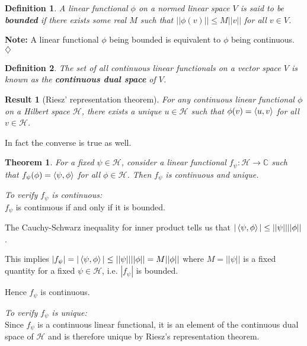 \documentclass[12pt,twoside,fleqn]{report}
\makeatletter
\theoremstyle{thmstyle}
\renewenvironment{proof}[1][\proofname]{\par
\pushQED{\qed}%
\normalfont \topsep6\p@\@plus6\p@\relax
\trivlist
\item[\hskip\labelsep\itshape#1\@addpunct{.}]\mbox{}\par\nobreak\ignorespaces
}{%
    \popQED\endtrivlist\@endpefalse
    }
\newtheorem{defn}{Definition}[chapter]
\newtheorem{thm}{Theorem}[chapter]
\newtheorem{result}{Result}[chapter]
\newenvironment{note}{\textbf{Note:}}{\hfill\ensuremath{\diamondsuit}}
\makeatother
\begin{document}
\begin{defn}
A linear functional $\phi$ on a normed linear space $V$ is said to be \textbf{bounded} if there exists some real $M$ such that $|| \phi(v)|| \leq M ||v||$ for all $v \in V$. 
\end{defn}

\begin{note}
A linear functional $\phi$ being bounded is equivalent to $\phi$ being continuous.
\end{note}

\begin{defn}
    The set of all continuous linear functionals on a vector space $V$ is known as the \textbf{continuous dual space} of $V$.
\end{defn}

\begin{result}[Riesz' representation theorem]
    For any continuous linear functional $\phi$ on a Hilbert space $\mathcal{H}$, there exists a unique $u \in \mathcal{H}$ such that $\phi(v) = \braket{u,v}$ for all $v \in \mathcal{H}$. 
\end{result}

In fact the converse is true as well.

\begin{thm}
\label{innerproduct:continuous}
For a fixed $\psi \in \mathcal{H}$, consider a linear functional $f_\psi : \mathcal{H} \to \mathbb{C}$ such that $f_\psi(\phi) = \braket{\psi,\phi}$ for all $\phi \in \mathcal{H}$. Then $f_\psi$ is continuous and unique. 
\end{thm}
\begin{proof}
    \textit{To verify $f_\psi$ is continuous:} \\
    $f_\psi$ is continuous if and only if it is bounded. 

    The Cauchy-Schwarz inequality for inner product tells us that $|\braket{\psi,\phi}| \leq ||\psi||||\phi||$.

    This implies $|f_\psi| = |\braket{\psi,\phi}| \leq ||\psi|| ||\phi|| = M ||\phi||$ where $M = ||\psi||$ is a fixed quantity for a fixed $\psi \in \mathcal{H}$, i.e. $|f_\psi|$ is bounded.

    Hence $f_\psi$ is continuous. 

    \textit{To verify $f_\psi$ is unique:} \\
    
    Since $f_\psi$ is a continuous linear functional, it is an element of the continuous dual space of $\mathcal{H}$ and is therefore unique by Riesz's representation theorem.
\end{proof}
\end{document}
